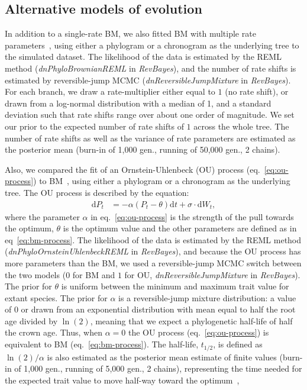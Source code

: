 \documentclass{article}
\newcommand{\Multiply}{\cdot}
\newcommand{\der}{\mathrm{d}}
\newcommand{\Trait}{P}
\begin{document}
\subsection*{Alternative models of evolution}
In addition to a single-rate BM, we also fitted BM with multiple rate parameters~\citep{eastman_novel_2011}, using either a phylogram or a chronogram as the underlying tree to the simulated dataset.
The likelihood of the data is estimated by the REML method (\textit{dnPhyloBrownianREML} in \textit{RevBayes}), and the number of rate shifts is estimated by reversible-jump MCMC (\textit{dnReversibleJumpMixture} in \textit{RevBayes}).
For each branch, we draw a rate-multiplier either equal to $1$ (no rate shift), or drawn from a log-normal distribution with a median of 1, and a standard deviation such that rate shifts range over about one order of magnitude.
We set our prior to the expected number of rate shifts of $1$ across the whole tree.
The number of rate shifts as well as the variance of rate parameters are estimated as the posterior mean (burn-in of 1,000 gen., running of 50,000 gen., 2 chains).

Also, we compared the fit of an Ornstein-Uhlenbeck (OU) process (eq.~\ref{eq:ou-process}) to BM~\citep{hansen_stabilizing_1997,butler_phylogenetic_2004}, using either a phylogram or a chronogram as the underlying tree.
The OU process is described by the equation:
\begin{align}
    \der \Trait_t & = -\alpha \left( \Trait_t - \theta \right) \der t + \sigma \Multiply \der W_t, \label{eq:ou-process}
\end{align}
where the parameter $\alpha$ in eq.~\ref{eq:ou-process} is the strength of the pull towards the optimum, $\theta$ is the optimum value and the other parameters are defined as in eq~\ref{eq:bm-process}.
The likelihood of the data is estimated by the REML method (\textit{dnPhyloOrnsteinUhlenbeckREML} in \textit{RevBayes}), and because the OU process has more parameters than the BM, we used a reversible-jump MCMC switch between the two models ($0$ for BM and $1$ for OU, \textit{dnReversibleJumpMixture} in \textit{RevBayes}).
The prior for $\theta$ is uniform between the minimum and maximum trait value for extant species.
The prior for $\alpha$ is a reversible-jump mixture distribution: a value of $0$ or drawn from an exponential distribution with mean equal to half the root age divided by $\ln (2)$, meaning that we expect a phylogenetic half-life of half the crown age.
Thus, when $\alpha = 0$ the OU process (eq.~\ref{eq:ou-process}) is equivalent to BM (eq.~\ref{eq:bm-process}).
The half-life, $t_{1/2}$, is defined as $\ln(2) / \alpha$ is also estimated as the posterior mean estimate of finite values (burn-in of 1,000 gen., running of 5,000 gen., 2 chains), representing the time needed for the expected trait value to move half-way toward the optimum~\citep{hansen_stabilizing_1997, grabowski_cautionary_2023},
\end{document}
